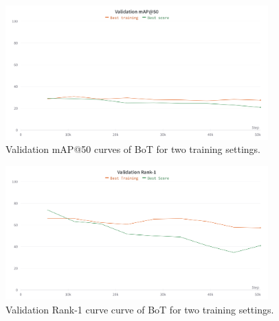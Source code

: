 \begin{figure}[!p]
    \centering
    \includegraphics[width=0.9\textwidth]{figures/06_results/ApperanceValidationMAP.png}
    \caption[Validation mAP@50 curves of BoT]{\footnotesize{Validation mAP@50 curves of BoT for two training settings.}}
    \label{fig:appearance mAP50}
\end{figure}

\begin{figure}[!p]
	\centering
	\includegraphics[width=0.9\textwidth]{figures/06_results/ApperanceValidationRank-1.png}
	\caption[Validation Rank-1 curve of BoT]{\footnotesize{Validation Rank-1 curve curve of BoT for two training settings.}}
	\label{fig:appearanceRank1}
\end{figure}

